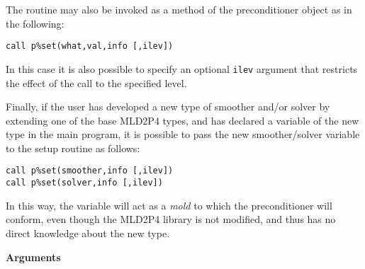 The routine may also be invoked as a method
of the preconditioner object as in the following:
\begin{center}
\verb|call p%set(what,val,info [,ilev])|\\
\end{center}
In this case it is also possible to specify an optional \verb|ilev|
argument that restricts the effect of 
the call to the specified level.

Finally, if the user has developed  a new type of smoother and/or
solver by extending one of the base MLD2P4 types, and has declared a
variable of the new  type in the main program, it is possible to pass
the new smoother/solver variable  to the setup routine as follows:
\begin{center}
\verb|call p%set(smoother,info [,ilev])|\\
\verb|call p%set(solver,info [,ilev])|
\end{center}
In this way, the variable will act as a \emph{mold} to which the
preconditioner will conform, even though the MLD2P4 library is not
modified, and thus has no direct knowledge about the new type. 

{\baselineskip\noindent\large\bfseries Arguments}

